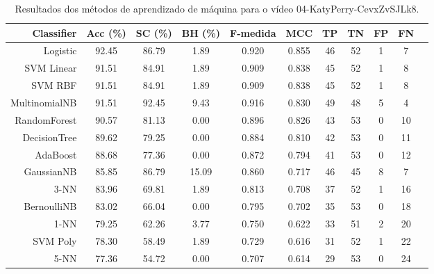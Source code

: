 \begin{table}[!htb]
\centering
\caption{Resultados dos métodos de aprendizado de máquina para o vídeo 04-KatyPerry-CevxZvSJLk8.}
\label{tab:04-KatyPerry-CevxZvSJLk8}
\begin{tabular}{r|c|c|c|c|c|c|c|c|c|c}
\hline\hline
Classifier & Acc (\%) & SC (\%) & BH (\%) & F-medida & MCC & TP & TN & FP & FN \\ \hline
Logistic & 92.45 & 86.79 & 1.89 & 0.920 & 0.855 & 46 & 52 & 1 & 7 \\ 
SVM Linear & 91.51 & 84.91 & 1.89 & 0.909 & 0.838 & 45 & 52 & 1 & 8 \\ 
SVM RBF & 91.51 & 84.91 & 1.89 & 0.909 & 0.838 & 45 & 52 & 1 & 8 \\ 
MultinomialNB & 91.51 & 92.45 & 9.43 & 0.916 & 0.830 & 49 & 48 & 5 & 4 \\ 
RandomForest & 90.57 & 81.13 & 0.00 & 0.896 & 0.826 & 43 & 53 & 0 & 10 \\ 
DecisionTree & 89.62 & 79.25 & 0.00 & 0.884 & 0.810 & 42 & 53 & 0 & 11 \\ 
AdaBoost & 88.68 & 77.36 & 0.00 & 0.872 & 0.794 & 41 & 53 & 0 & 12 \\ 
GaussianNB & 85.85 & 86.79 & 15.09 & 0.860 & 0.717 & 46 & 45 & 8 & 7 \\ 
3-NN & 83.96 & 69.81 & 1.89 & 0.813 & 0.708 & 37 & 52 & 1 & 16 \\ 
BernoulliNB & 83.02 & 66.04 & 0.00 & 0.795 & 0.702 & 35 & 53 & 0 & 18 \\ 
1-NN & 79.25 & 62.26 & 3.77 & 0.750 & 0.622 & 33 & 51 & 2 & 20 \\ 
SVM Poly & 78.30 & 58.49 & 1.89 & 0.729 & 0.616 & 31 & 52 & 1 & 22 \\ 
5-NN & 77.36 & 54.72 & 0.00 & 0.707 & 0.614 & 29 & 53 & 0 & 24 \\ 
\hline\hline
\end{tabular}
\end{table}
